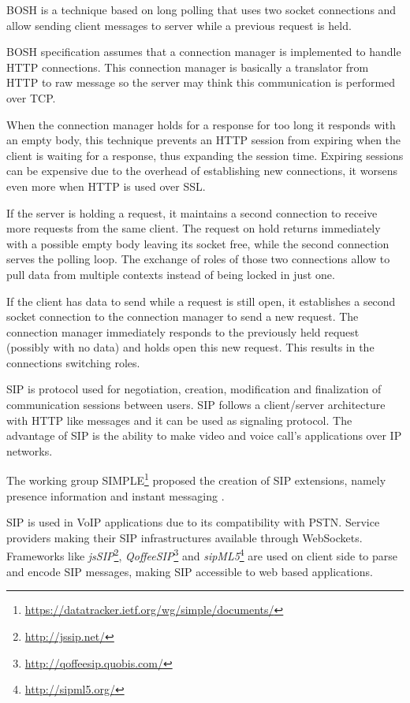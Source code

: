   \ac{BOSH}\cite{xep0124} is a technique based on long polling that uses two socket connections and allow sending client messages to server while a previous request is held.

  \ac{BOSH} specification assumes that a connection manager is implemented to handle \ac{HTTP} connections. This connection manager is basically a translator from \ac{HTTP} to raw message so the server may think this communication is performed over \ac{TCP}.

  When the connection manager holds for a response for too long it responds with an empty body, this technique prevents an \ac{HTTP} session from expiring when the client is waiting for a response, thus expanding the session time. Expiring sessions can be expensive due to the overhead of establishing new connections, it worsens even more when \ac{HTTP} is used over \ac{SSL}.

  If the server is holding a request, it maintains a second connection to receive more requests from the same client. The request on hold returns immediately with a possible empty body leaving its socket free, while the second connection serves the polling loop. The exchange of roles of those two connections allow to pull data from multiple contexts instead of being locked in just one.

  If the client has data to send while a request is still open, it establishes a second socket connection to the connection manager to send a new request. The connection manager immediately responds to the previously held request (possibly with no data) and holds open this new request. This results in the connections switching roles.

  \ac{SIP} \cite{rfc3261} is protocol used for negotiation, creation, modification and finalization of communication sessions between users. \ac{SIP} follows a client/server architecture with \ac{HTTP} like messages and it can be used as signaling protocol. The advantage of \ac{SIP} is the ability to make video and voice call's applications over \ac{IP} networks.

  The working group \ac{SIMPLE}\footnote{\url{https://datatracker.ietf.org/wg/simple/documents/}} proposed the creation of \ac{SIP} extensions, namely presence information \cite{rfc5263} and instant messaging \cite{rfc3428}.

  \ac{SIP} is used in \ac{VoIP} applications due to its compatibility with \ac{PSTN}. Service providers making their \ac{SIP} infrastructures available through WebSockets. Frameworks like \textit{jsSIP}\footnote{\url{http://jssip.net/}}, \textit{QoffeeSIP}\footnote{\url{http://qoffeesip.quobis.com/}} and \textit{sipML5}\footnote{\url{http://sipml5.org/}} are used on client side to parse and encode \ac{SIP} messages, making \ac{SIP} accessible to web based applications. 

